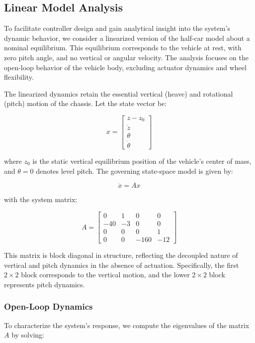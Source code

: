 \documentclass[]{report}
\begin{document}
\newpage

\subsection{Linear Model Analysis}

To facilitate controller design and gain analytical insight into the system's dynamic behavior, we consider a linearized version of the half-car model about a nominal equilibrium. This equilibrium corresponds to the vehicle at rest, with zero pitch angle, and no vertical or angular velocity. The analysis focuses on the open-loop behavior of the vehicle body, excluding actuator dynamics and wheel flexibility.

The linearized dynamics retain the essential vertical (heave) and rotational (pitch) motion of the chassis. Let the state vector be:

\[
x = \begin{bmatrix}
	z - z_0 \\
	\dot{z} \\
	\theta \\
	\dot{\theta}
\end{bmatrix}
\]

where \( z_0 \) is the static vertical equilibrium position of the vehicle's center of mass, and \( \theta = 0 \) denotes level pitch. The governing state-space model is given by:

\[
\dot{x} = A x
\]

with the system matrix:

\[
A =
\begin{bmatrix}
	0 & 1 & 0 & 0 \\
	-40 & -3 & 0 & 0 \\
	0 & 0 & 0 & 1 \\
	0 & 0 & -160 & -12
\end{bmatrix}
\]

This matrix is block diagonal in structure, reflecting the decoupled nature of vertical and pitch dynamics in the absence of actuation. Specifically, the first \( 2 \times 2 \) block corresponds to the vertical motion, and the lower \( 2 \times 2 \) block represents pitch dynamics.

\subsubsection{Open-Loop Dynamics}

To characterize the system's response, we compute the eigenvalues of the matrix \( A \) by solving:
\end{document}
